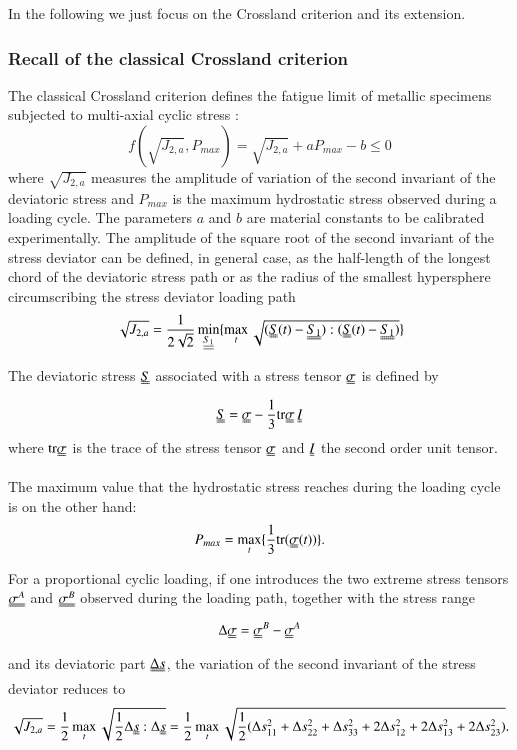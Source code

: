 \documentclass[3p,times,procedia,number]{elsarticle}
\begin{document}
In the following we just focus on the Crossland criterion and its extension.

\subsubsection{Recall of the classical Crossland criterion}

The classical Crossland criterion defines the fatigue limit of metallic specimens subjected to multi-axial cyclic stress\cite{Crossland} : 
\begin{equation}
f(\sqrt{J_{2,a}},P_{max})=\sqrt{J_{2,a}}+aP_{max}-b\leqslant 0\label{eq:crossland}
\end{equation}
where $\sqrt{J_{2,a}}$ measures  the amplitude of variation of the second invariant of the deviatoric stress  and $P_{max}$ is the maximum hydrostatic stress observed during a loading cycle. The parameters $a$ and $b$ are material constants to be calibrated experimentally. The amplitude of the square root of the second invariant of the stress deviator can be defined, in general case, as the half-length of the longest chord of the deviatoric stress path or as the radius of the smallest hypersphere circumscribing the stress deviator loading path \cite{Papadopoulos1997219}
\begin{equation}\sqrt{J_{2,a}}=\frac{1}{2\sqrt{2}}\min \limits_{\uline{\uline{S_1}}}\{\max \limits_{t}\sqrt{(\uuline{S}(t)-\uuline{S_1}):(\uuline{S}(t)-\uuline{S_1})}\}\end{equation}

The deviatoric stress $\uuline{S}$ associated with a stress tensor $\uuline{\sigma}$  is defined by
\begin{equation} \uuline{S}=\uuline{\sigma}-\frac{1}{3}\textrm{tr}\uuline{\sigma}\, \uuline{I}
\end{equation}
where $\textrm{tr}\uuline{\sigma}$ is the trace of the stress tensor $\uuline{\sigma}$ and $\uuline{I}$ the second order unit tensor.

The maximum value that the hydrostatic stress reaches during the loading cycle is on the other hand:
\begin{equation}
P_{max}=\max\limits_{t}\{\frac{1}{3}\textrm{tr}(\uuline{\sigma}(t))\}.
\end{equation}

For a proportional cyclic loading, if one introduces the two extreme stress tensors $\uuline{\sigma^A}$ and $\uuline{\sigma^B}$ observed during the loading path, together with the stress range 
\begin{equation}\Delta\uuline{\sigma}=\uuline{\sigma}^B-\uuline{\sigma}^A\end{equation}
and its deviatoric part $\uuline{\Delta s} $, the variation of
the second invariant of the stress deviator reduces to 
\begin{equation}\sqrt{J_{2,a}}=\frac{1}{2}\max\limits_{t}\sqrt{\frac{1}{2}\Delta\uuline{s}:\Delta\uuline{ s}}=\frac{1}{2}\max\limits_{t}\sqrt{\frac{1}{2}(\Delta s_{11}^2+\Delta s_{22}^2+\Delta s_{33}^2+2\Delta s_{12}^2+2\Delta s_{13}^2+2\Delta s_{23}^2)}.\end{equation}
\end{document}
